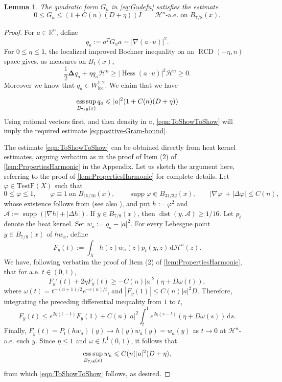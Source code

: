 \documentclass[12pt,a4paper,reqno]{amsart}
\newtheorem{lemma}[theorem]{Lemma}
\renewcommand{\leq}{\leqslant}
\renewcommand{\geq}{\geqslant}
\newcommand{\R}{\mathbb R}
\newcommand{\Hn}{\mathcal H^n}
\newcommand{\TestF}{\mathrm{TestF}}
\newcommand{\Hess}{\operatorname{Hess}}
\newcommand{\loc}{\mathrm{loc}}
\newcommand{\supp}{\operatorname{supp}}
\newcommand{\dist}{\operatorname{dist}}
\begin{document}
\begin{lemma}
    The quadratic form $G_u$ in \eqref{eq:Gudefn} satisfies the estimate
    \begin{equation}\label{eq:positive-Gram-bound}
 0\leq G_u\leq(1+C(n)(D+\eta))I
 \qquad \Hn\text{-a.e. on }B_{7/8}(x).
\end{equation}
\end{lemma}
\begin{proof}
For $a\in\R^n$, define
\[
 q_a:=a^TG_ua=|\nabla(a\cdot u)|^2.
\]
For $0\leq \eta\leq 1$,  the localized improved Bochner inequality \cite[Proposition~2.14]{GigliViolo} on an
$\operatorname{RCD}(-\eta,n)$ space gives, as measures on $B_1(x)$,
\begin{equation}\label{eqn:Boundqa}
 \frac12\mathbf{\Delta}q_a+\eta q_a\Hn
 \geq |\Hess(a\cdot u)|^2\Hn\geq0.
\end{equation}
Moreover we know that $q_a\in W^{1,2}_{\loc}$. We claim that we have

\begin{equation}\label{eqn:ToShowToShow}
 \mathop{\rm ess\,sup}_{B_{7/8}(x)}q_a
 \leq |a|^2(1+C(n)(D+\eta))
\end{equation}
Using rational vectors first, and then
density in $a$, \eqref{eqn:ToShowToShow} will imply the required estimate \eqref{eq:positive-Gram-bound}.

The estimate \eqref{eqn:ToShowToShow} can be obtained directly from heat kernel estimates, arguing verbatim as in the proof of Item (2) of \cref{lem:PropertiesHarmonic} in the Appendix. Let us sketch the argument here, referring to the proof of \cref{lem:PropertiesHarmonic} for complete details. Let $\varphi\in\TestF(X)$ such that
\[
 0\leq\varphi\leq1,\qquad
 \varphi\equiv1\ \text{on }B_{15/16}(x),\qquad
 \supp\varphi\Subset B_{31/32}(x),\qquad
 |\nabla\varphi|+|\Delta\varphi|\leq C(n),
\]
whose existence follows from \cite[Proposition~2.13]{GigliViolo} (see also \cite[Lemma 3.1]{MondinoNaber}), and put $h:=\varphi^2$ and $\mathcal A:=\supp(|\nabla h|+|\Delta h|)$. If $y\in B_{7/8}(x)$, then $\dist(y,\mathcal A)\geq1/16$. Let $p_t$ denote the heat kernel. 
Set $w_a:=q_a-|a|^2$. For every Lebesgue point $y\in B_{7/8}(x)$ of $h w_a$, define
\[
 F_y(t):=\int_X h(z)w_a(z)p_t(y,z)\,\mathrm{d}\Hn(z).
\]
We have, following verbatim the proof of Item (2) of \cref{lem:PropertiesHarmonic}, that for a.e. $t\in (0,1)$,
\[
 F_y'(t)+2\eta F_y(t)
 \geq-C(n)|a|^2\left(\eta+D\omega(t)\right),
\]
where $\omega(t)=t^{-(n+1)/2}e^{-c(n)/t}$, and $|F_y(1)|\leq C(n)|a|^2 D$. Therefore, integrating the preceding differential inequality from $1$ to $t$,
\[
 F_y(t)\leq e^{2\eta(1-t)}F_y(1)
 +C(n)|a|^2\int_t^1e^{2\eta(s-t)}
                 \left(\eta+D\omega(s)\right)\,\mathrm{d}s.
\]
Finally, $F_y(t)=P_t(hw_a)(y)\to h(y)w_a(y)=w_a(y)$ as $t\to 0$ at $\Hn$-a.e. such $y$. Since $\eta\leq1$ and $\omega\in L^1(0,1)$, it follows that
\[
 \mathop{\rm ess\,sup}_{B_{7/8}(x)}w_a
 \leq C(n)|a|^2(D+\eta),
\]
from which \eqref{eqn:ToShowToShow} follows, as desired.
\end{proof}
\end{document}
